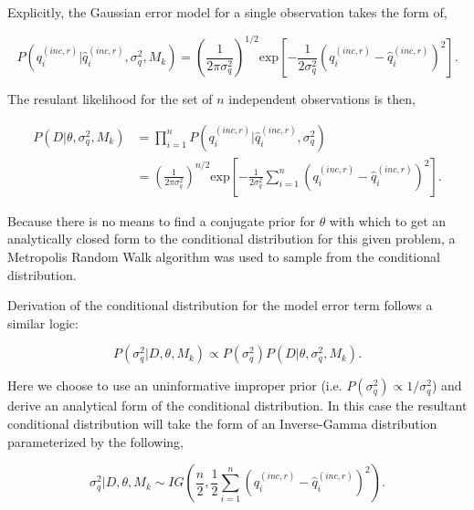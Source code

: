 \documentclass[article]{proc}
\begin{document}
        \noindent Explicitly, the Gaussian error model for a single observation takes the form of, 

        \begin{equation}\label{eq:likelihood}
            P(q_i^{(inc,r)}| \hat{q}_i^{(inc,r)}, \sigma_q^2, M_k) = \left(\frac{1}{2 \pi \sigma_q^2} \right)^{1/2} \text{exp} \left[-\frac{1}{2 \sigma_q^2} \left( q_i^{(inc,r)} - \hat{q}_i^{(inc,r)} \right)^2 \right].
        \end{equation}

        \noindent The resulant likelihood for the set of $n$ independent observations is then,

        \begin{align}\label{eq:likelihood_2}
            P(D| \theta, \sigma_q^2, M_k) &= \prod_{i=1}^n P(q_i^{(inc,r)}| \hat{q}_i^{(inc,r)}, \sigma_q^2) \\
            &= \left(\frac{1}{2 \pi \sigma_q^2} \right)^{n/2} \text{exp} \left[-\frac{1}{2 \sigma_q^2} \sum_{i=1}^n \left(q_i^{(inc,r)} - \hat{q}_i^{(inc,r)} \right)^2 \right].
        \end{align}

        \noindent Because there is no means to find a conjugate prior for $\theta$ with which to get an analytically closed form to the conditional distribution for this given problem, a Metropolis Random Walk algorithm was used to sample from the conditional distribution.

        Derivation of the conditional distribution for the model error term follows a similar logic:

        \begin{equation}\label{eq:sigma_q}
            P(\sigma_q^2 | D, \theta, M_k) \propto P(\sigma_q^2) P(D| \theta, \sigma_q^2, M_k).
        \end{equation}

        \noindent Here we choose to use an uninformative improper prior (i.e. $P(\sigma_q^2) \propto 1/\sigma_q^2$) and derive an analytical form of the conditional distribution. In this case the resultant conditional distribution will take the form of an Inverse-Gamma distribution parameterized by the following,

        \begin{equation}\label{eq:sigma_q_conditional}
            \sigma_q^2 | D, \theta, M_k \sim IG \left(\frac{n}{2},  \frac{1}{2}\sum_{i=1}^n \left(q_i^{(inc,r)} - \hat{q}_i^{(inc,r)} \right)^2\right).
        \end{equation}
\end{document}

